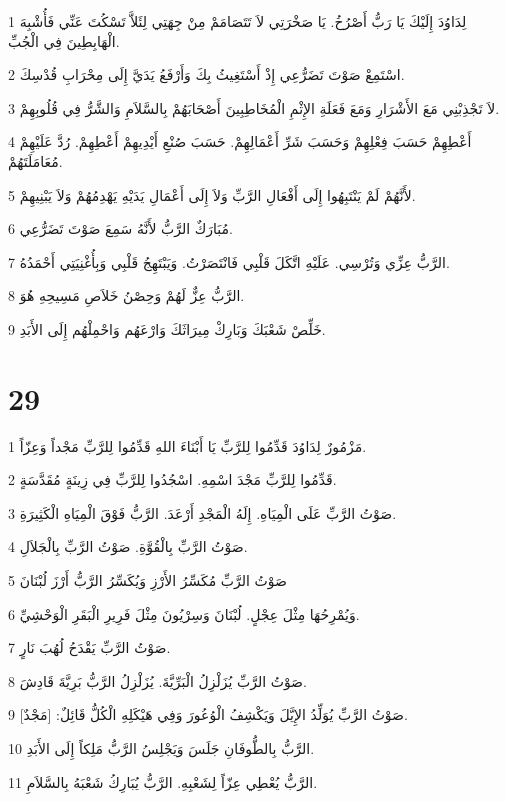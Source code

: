 \par 1 لِدَاوُدَ إِلَيْكَ يَا رَبُّ أَصْرُخُ. يَا صَخْرَتِي لاَ تَتَصَامَمْ مِنْ جِهَتِي لِئَلاَّ تَسْكُتَ عَنِّي فَأُشْبِهَ الْهَابِطِينَ فِي الْجُبِّ.
\par 2 اسْتَمِعْ صَوْتَ تَضَرُّعِي إِذْ أَسْتَغِيثُ بِكَ وَأَرْفَعُ يَدَيَّ إِلَى مِحْرَابِ قُدْسِكَ.
\par 3 لاَ تَجْذِبْنِي مَعَ الأَشْرَارِ وَمَعَ فَعَلَةِ الإِثْمِ الْمُخَاطِبِينَ أَصْحَابَهُمْ بِالسَّلاَمِ وَالشَّرُّ فِي قُلُوبِهِمْ.
\par 4 أَعْطِهِمْ حَسَبَ فِعْلِهِمْ وَحَسَبَ شَرِّ أَعْمَالِهِمْ. حَسَبَ صُنْعِ أَيْدِيهِمْ أَعْطِهِمْ. رُدَّ عَلَيْهِمْ مُعَامَلَتَهُمْ.
\par 5 لأَنَّهُمْ لَمْ يَنْتَبِهُوا إِلَى أَفْعَالِ الرَّبِّ وَلاَ إِلَى أَعْمَالِ يَدَيْهِ يَهْدِمُهُمْ وَلاَ يَبْنِيهِمْ.
\par 6 مُبَارَكٌ الرَّبُّ لأَنَّهُ سَمِعَ صَوْتَ تَضَرُّعِي.
\par 7 الرَّبُّ عِزِّي وَتُرْسِي. عَلَيْهِ اتَّكَلَ قَلْبِي فَانْتَصَرْتُ. وَيَبْتَهِجُ قَلْبِي وَبِأُغْنِيَتِي أَحْمَدُهُ.
\par 8 الرَّبُّ عِزٌّ لَهُمْ وَحِصْنُ خَلاَصِ مَسِيحِهِ هُوَ.
\par 9 خَلِّصْ شَعْبَكَ وَبَارِكْ مِيرَاثَكَ وَارْعَهُم وَاحْمِلْهُم إِلَى الأَبَدِ.

\chapter{29}

\par 1 مَزْمُورٌ لِدَاوُدَ قَدِّمُوا لِلرَّبِّ يَا أَبْنَاءَ اللهِ قَدِّمُوا لِلرَّبِّ مَجْداً وَعِزّاً.
\par 2 قَدِّمُوا لِلرَّبِّ مَجْدَ اسْمِهِ. اسْجُدُوا لِلرَّبِّ فِي زِينَةٍ مُقَدَّسَةٍ.
\par 3 صَوْتُ الرَّبِّ عَلَى الْمِيَاهِ. إِلَهُ الْمَجْدِ أَرْعَدَ. الرَّبُّ فَوْقَ الْمِيَاهِ الْكَثِيرَةِ.
\par 4 صَوْتُ الرَّبِّ بِالْقُوَّةِ. صَوْتُ الرَّبِّ بِالْجَلاَلِ.
\par 5 صَوْتُ الرَّبِّ مُكَسِّرُ الأَرْزِ وَيُكَسِّرُ الرَّبُّ أَرْزَ لُبْنَانَ
\par 6 وَيُمْرِحُهَا مِثْلَ عِجْلٍ. لُبْنَانَ وَسِرْيُونَ مِثْلَ فَرِيرِ الْبَقَرِ الْوَحْشِيِّ.
\par 7 صَوْتُ الرَّبِّ يَقْدَحُ لُهُبَ نَارٍ.
\par 8 صَوْتُ الرَّبِّ يُزَلْزِلُ الْبَرِّيَّةَ. يُزَلْزِلُ الرَّبُّ بَرِيَّةَ قَادِشَ.
\par 9 صَوْتُ الرَّبِّ يُوَلِّدُ الإِيَّلَ وَيَكْشِفُ الْوُعُورَ وَفِي هَيْكَلِهِ الْكُلُّ قَائِلٌ: [مَجْدٌ].
\par 10 الرَّبُّ بِالطُّوفَانِ جَلَسَ وَيَجْلِسُ الرَّبُّ مَلِكاً إِلَى الأَبَدِ.
\par 11 الرَّبُّ يُعْطِي عِزّاً لِشَعْبِهِ. الرَّبُّ يُبَارِكُ شَعْبَهُ بِالسَّلاَمِ.

